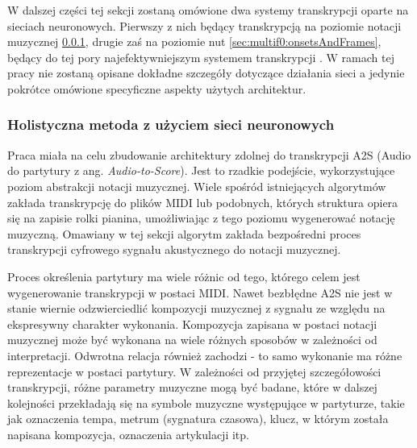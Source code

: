 \documentclass[12pt,a4paper,twoside]{mwart}
\begin{document}

W dalszej części tej sekcji zostaną omówione dwa systemy transkrypcji oparte na sieciach neuronowych. Pierwszy z nich będący transkrypcją na poziomie notacji muzycznej \ref{sec:multif0:petrusNetwork}, drugie zaś na poziomie nut \ref{sec:multif0:onsetsAndFrames}, będący do tej pory najefektywniejszym systemem transkrypcji \cite[7]{DBLP:journals/spm/BenetosDDE19}. W ramach tej pracy nie zostaną opisane dokładne szczegóły dotyczące działania sieci a jedynie pokrótce omówione specyficzne aspekty użytych architektur.


\subsubsection{Holistyczna metoda z użyciem sieci neuronowych}\label{sec:multif0:petrusNetwork}
Praca \cite{Transcription:Pertus:NeuralNetwork} miała na celu zbudowanie architektury zdolnej do transkrypcji A2S (Audio do partytury z ang. \textit{Audio-to-Score}). Jest to rzadkie podejście, wykorzystujące poziom abstrakcji notacji muzycznej. Wiele spośród istniejących algorytmów zakłada transkrypcję do plików MIDI lub podobnych, których struktura opiera się na zapisie rolki pianina, umożliwiając z tego poziomu wygenerować notację muzyczną. Omawiany w tej sekcji algorytm zakłada bezpośredni proces transkrypcji cyfrowego sygnału akustycznego do notacji muzycznej.

Proces określenia partytury ma wiele różnic od tego, którego celem jest wygenerowanie transkrypcji w postaci MIDI. Nawet bezbłędne A2S nie jest w stanie wiernie odzwierciedlić kompozycji muzycznej z sygnału ze względu na ekspresywny charakter wykonania. Kompozycja zapisana w postaci notacji muzycznej może być wykonana na wiele różnych sposobów w zależności od interpretacji. Odwrotna relacja również zachodzi - to samo wykonanie ma różne reprezentacje w postaci partytury. W zależności od przyjętej szczegółowości transkrypcji, różne parametry muzyczne mogą być badane, które w dalszej kolejności przekładają się na symbole muzyczne występujące w partyturze, takie jak oznaczenia tempa, metrum (sygnatura czasowa), klucz, w którym została napisana kompozycja, oznaczenia artykulacji itp.
\end{document}
